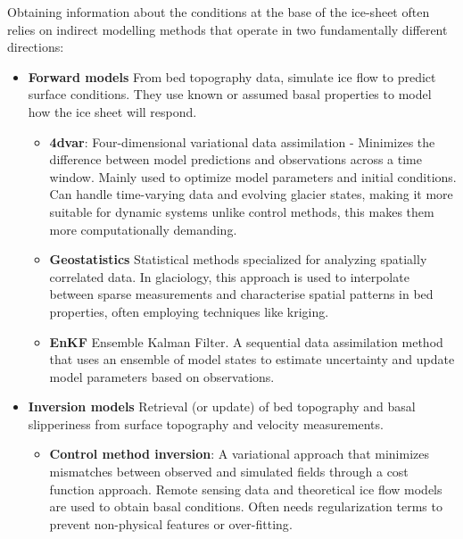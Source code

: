 Obtaining information about the conditions at the base of the ice-sheet often relies on indirect modelling methods that operate in two fundamentally different directions:
\begin{itemize}
    \item\textbf{Forward models}
    From bed topography data, simulate ice flow to predict surface conditions. They use known or assumed basal properties to model how the ice sheet will respond.
    
    \begin{itemize}
           \item\textbf{4dvar}: Four-dimensional variational data assimilation - Minimizes the difference between model predictions and observations across a time window. Mainly used to optimize model parameters and initial conditions\cite{Morlighem_Goldberg_2024}. Can handle time-varying data and evolving glacier states, making it more suitable for dynamic systems unlike control methods, this makes them more computationally demanding\cite{Morlighem_Goldberg_2024}.

            \item\textbf{Geostatistics} Statistical methods specialized for analyzing spatially correlated data. In glaciology, this approach is used to interpolate between sparse measurements and characterise spatial patterns in bed properties, often employing techniques like kriging\cite{Mackie_2020}.

            \item\textbf{EnKF} Ensemble Kalman Filter. A sequential data assimilation method that uses an ensemble of model states to estimate uncertainty and update model parameters based on observations\cite{Morlighem_Goldberg_2024}.
    \end{itemize}

    \item\textbf{Inversion models}
    Retrieval (or update) of bed topography and basal slipperiness from surface topography and velocity measurements\cite{deRydt_2013}.

        \begin{itemize}
            \item\textbf{Control method inversion}: A variational approach that minimizes mismatches between observed and simulated fields through a cost function approach. Remote sensing data and theoretical ice flow models are used to obtain basal conditions\cite{deRydt_2013}. Often needs regularization terms to prevent non-physical features or over-fitting\cite{Morlighem_Goldberg_2024}.


\end{itemize}
\end{itemize}
